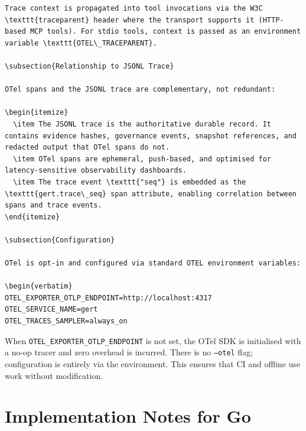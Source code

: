 \begin{verbatim}
Trace context is propagated into tool invocations via the W3C \texttt{traceparent} header where the transport supports it (HTTP-based MCP tools). For stdio tools, context is passed as an environment variable \texttt{OTEL\_TRACEPARENT}.

\subsection{Relationship to JSONL Trace}

OTel spans and the JSONL trace are complementary, not redundant:

\begin{itemize}
  \item The JSONL trace is the authoritative durable record. It contains evidence hashes, governance events, snapshot references, and redacted output that OTel spans do not.
  \item OTel spans are ephemeral, push-based, and optimised for latency-sensitive observability dashboards.
  \item The trace event \texttt{"seq"} is embedded as the \texttt{gert.trace\_seq} span attribute, enabling correlation between spans and trace events.
\end{itemize}

\subsection{Configuration}

OTel is opt-in and configured via standard OTEL environment variables:

\begin{verbatim}
OTEL_EXPORTER_OTLP_ENDPOINT=http://localhost:4317
OTEL_SERVICE_NAME=gert
OTEL_TRACES_SAMPLER=always_on
\end{verbatim}

When \texttt{OTEL\_EXPORTER\_OTLP\_ENDPOINT} is not set, the OTel SDK is initialised with a no-op tracer and zero overhead is incurred. There is no \texttt{--otel} flag; configuration is entirely via the environment. This ensures that CI and offline use work without modification.

\section{Implementation Notes for Go}

